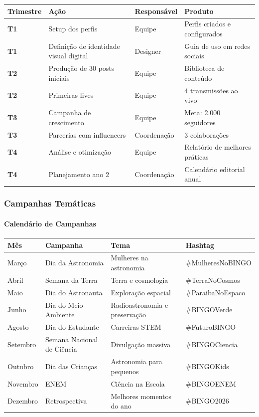 \bigskip\noindent
\begin{tabular}{p{}p{}p{}p{}}
\toprule
Trimestre & Ação & Responsável & Produto \\
\hline
\textbf{T1} & Setup dos perfis & Equipe & Perfis criados e configurados \\
\textbf{T1} & Definição de identidade visual digital & Designer & Guia de uso em redes sociais \\
\textbf{T2} & Produção de 30 posts iniciais & Equipe & Biblioteca de conteúdo \\
\textbf{T2} & Primeiras lives & Equipe & 4 transmissões ao vivo \\
\textbf{T3} & Campanha de crescimento & Equipe & Meta: 2.000 seguidores \\
\textbf{T3} & Parcerias com influencers & Coordenação & 3 colaborações \\
\textbf{T4} & Análise e otimização & Equipe & Relatório de melhores práticas \\
\textbf{T4} & Planejamento ano 2 & Coordenação & Calendário editorial anual \\
\bottomrule
\end{tabular}

\bigskip

\subsubsection{Campanhas Temáticas}

\paragraph{Calendário de Campanhas}

\bigskip\noindent
\begin{tabular}{p{}p{}p{}p{}}
\toprule
Mês & Campanha & Tema & Hashtag \\
\hline
Março & Dia da Astronomia & Mulheres na astronomia & \#MulheresNoBINGO \\
Abril & Semana da Terra & Terra e cosmologia & \#TerraNoCosmos \\
Maio & Dia do Astronauta & Exploração espacial & \#ParaibaNoEspaco \\
Junho & Dia do Meio Ambiente & Radioastronomia e preservação & \#BINGOVerde \\
Agosto & Dia do Estudante & Carreiras STEM & \#FuturoBINGO \\
Setembro & Semana Nacional de Ciência & Divulgação massiva & \#BINGOCiencia \\
Outubro & Dia das Crianças & Astronomia para pequenos & \#BINGOKids \\
Novembro & ENEM & Ciência na Escola & \#BINGOENEM \\
Dezembro & Retrospectiva & Melhores momentos do ano & \#BINGO2026 \\
\bottomrule
\end{tabular}

